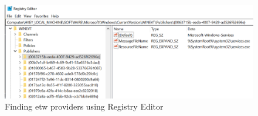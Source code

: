 \documentclass{report}
\begin{document}
\begin{figure}[H]
	\centering
    \includegraphics[width=\textwidth]{etw-providers-registry.png}
    \caption{Finding \gls{etw} providers using Registry Editor}
    \label{fig:etw:providers:registry}
\end{figure}
\end{document}
